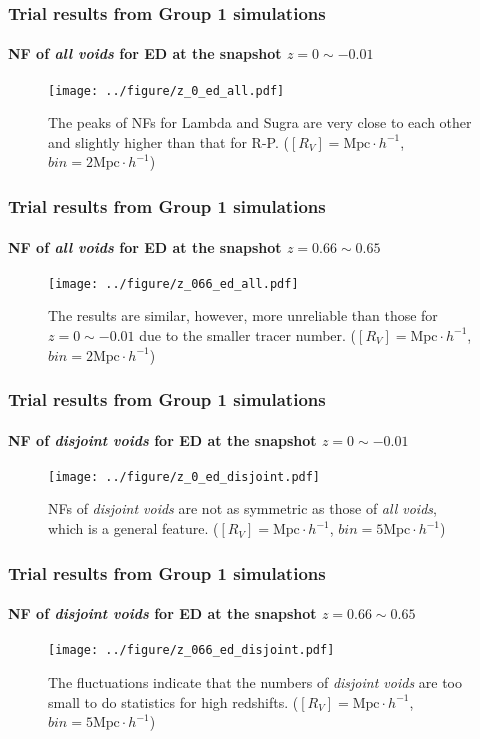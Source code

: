 \documentclass{beamer}
\newtheorem{Narrow down the analysis}{Narrow down the analysis}
\begin{document}
\begin{frame}
	\frametitle{Trial results from Group 1 simulations}
	\framesubtitle{NF of \textit{all voids} for ED at the snapshot $z=0\sim -0.01$}
	\pause
	\begin{figure}
\centering
\texttt{[image: ../figure/z\_0\_ed\_all.pdf]}
\caption{The peaks of NFs for Lambda and Sugra are very close to each other and slightly higher than that for R-P. ($[R_{V}]=\mathrm{Mpc}\cdot h^{-1}$, $bin=2\mathrm{Mpc}\cdot h^{-1}$)}
\label{1}
\end{figure}
\end{frame}

\begin{frame}
	\frametitle{Trial results from Group 1 simulations}
	\framesubtitle{NF of \textit{all voids} for ED at the snapshot $z=0.66\sim 0.65$}
	\pause 
	\begin{figure}
\centering
\texttt{[image: ../figure/z\_066\_ed\_all.pdf]}
\caption{The results are similar, however, more unreliable than those for $z=0\sim -0.01$ due to the smaller tracer number. ($[R_{V}]=\mathrm{Mpc}\cdot h^{-1}$, $bin=2\mathrm{Mpc}\cdot h^{-1}$)}
\label{7}
\end{figure}
\end{frame}

\begin{frame}
	\frametitle{Trial results from Group 1 simulations}
	\framesubtitle{NF of \textit{disjoint voids} for ED at the snapshot $z=0\sim -0.01$}
	\pause 
	\begin{figure}
\centering
\texttt{[image: ../figure/z\_0\_ed\_disjoint.pdf]}
\caption{NFs of \textit{disjoint voids} are not as symmetric as those of \textit{all voids}, which is a general feature. ($[R_{V}]=\mathrm{Mpc}\cdot h^{-1}$, $bin=5\mathrm{Mpc}\cdot h^{-1}$)}
\label{2}
\end{figure}
\end{frame}

\begin{frame}
	\frametitle{Trial results from Group 1 simulations}
	\framesubtitle{NF of \textit{disjoint voids} for ED at the snapshot $z=0.66\sim 0.65$}
	\pause 
\begin{figure}
\centering
\texttt{[image: ../figure/z\_066\_ed\_disjoint.pdf]}
\caption{The fluctuations indicate that the numbers of \textit{disjoint voids} are too small to do statistics for high redshifts. ($[R_{V}]=\mathrm{Mpc}\cdot h^{-1}$, $bin=5\mathrm{Mpc}\cdot h^{-1}$)}
\label{8}
\end{figure}
\end{frame}
\end{document}
